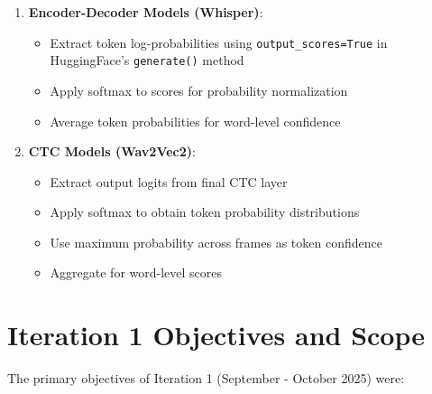 \begin{enumerate}
    \item \textbf{Encoder-Decoder Models (Whisper)}:
    \begin{itemize}
        \item Extract token log-probabilities using \texttt{output\_scores=True} in HuggingFace's \texttt{generate()} method
        \item Apply softmax to scores for probability normalization
        \item Average token probabilities for word-level confidence
    \end{itemize}
    
    \item \textbf{CTC Models (Wav2Vec2)}:
    \begin{itemize}
        \item Extract output logits from final CTC layer
        \item Apply softmax to obtain token probability distributions
        \item Use maximum probability across frames as token confidence
        \item Aggregate for word-level scores
    \end{itemize}
\end{enumerate}

\section{Iteration 1 Objectives and Scope}

The primary objectives of Iteration 1 (September - October 2025) were:

